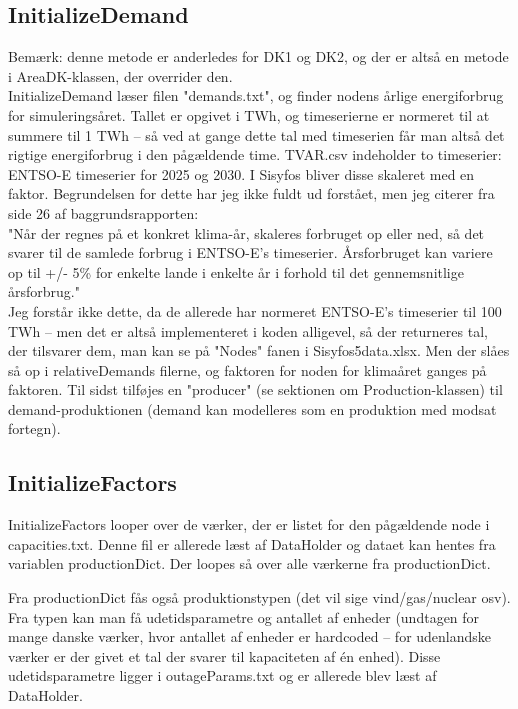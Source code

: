 \documentclass{article}
\begin{document}
\subsection{InitializeDemand}
Bemærk: denne metode er anderledes for DK1 og DK2, og der er altså en metode i AreaDK-klassen, der overrider den.
\\
InitializeDemand læser filen "demands.txt", og finder nodens årlige energiforbrug for simuleringsåret. Tallet er opgivet i TWh, og timeserierne er normeret til at summere til 1 TWh -- så ved at gange dette tal med timeserien får man altså det rigtige energiforbrug i den pågældende time. TVAR.csv indeholder to timeserier: ENTSO-E timeserier for 2025 og 2030. I Sisyfos bliver disse skaleret med en faktor. Begrundelsen for dette har jeg ikke fuldt ud forstået, men jeg citerer fra side 26 af baggrundsrapporten: 
\\
"Når der regnes på et konkret klima-år, skaleres forbruget op eller ned, så det svarer til de samlede forbrug i ENTSO-E’s timeserier. Årsforbruget kan variere op til +/- 5\% for enkelte lande i enkelte år i forhold til det gennemsnitlige årsforbrug."
\\
Jeg forstår ikke dette, da de allerede har normeret ENTSO-E's timeserier til 100 TWh -- men det er altså implementeret i koden alligevel, så der returneres tal, der tilsvarer dem, man kan se på "Nodes" fanen i Sisyfos5data.xlsx. Men der slåes så op i relativeDemands filerne, og faktoren for noden for klimaåret ganges på faktoren. Til sidst tilføjes en "producer" (se sektionen om Production-klassen) til demand-produktionen (demand kan modelleres som en produktion med modsat fortegn).

\subsection{InitializeFactors}
InitializeFactors looper over de værker, der er listet for den pågældende node i capacities.txt. Denne fil er allerede læst af DataHolder og dataet kan hentes fra variablen productionDict. Der loopes så over alle værkerne fra productionDict. 

Fra productionDict fås også produktionstypen (det vil sige vind/gas/nuclear osv). Fra typen kan man få udetidsparametre og antallet af enheder (undtagen for mange danske værker, hvor antallet af enheder er hardcoded -- for udenlandske værker er der givet et tal der svarer til kapaciteten af én enhed). Disse udetidsparametre ligger i outageParams.txt og er allerede blev læst af DataHolder. 
\end{document}
